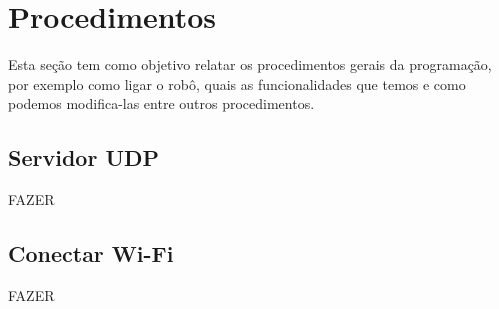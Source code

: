 \section{Procedimentos}
	Esta seção tem como objetivo relatar os procedimentos gerais da programação, por exemplo como ligar o robô, quais as funcionalidades que temos e como podemos modifica-las entre outros procedimentos.

\subsection{Servidor UDP}
FAZER

\subsection{Conectar Wi-Fi}
FAZER
